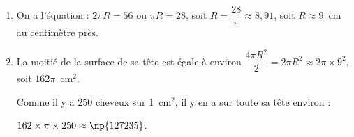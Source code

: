 
\medskip

%
%
%
%

\begin{enumerate}
\item %
On a l'équation : $2\pi R = 56$ ou $\pi R = 28$, soit $R = \dfrac{28}{\pi} \approx 8,91$, soit  $R \approx 9$~cm au centimètre près.
\item %

La moitié de la surface de sa tête est égale à environ $\dfrac{4\pi R^2}{2} = 2\pi R^2 \approx 2 \pi \times 9^2$, soit $162\pi$~cm$^2$.

Comme il y a $250$ cheveux sur 1~cm$^2$, il y en a sur toute sa tête environ :

$162 \times \pi \times 250 \approx \np{127235}$. 
\end{enumerate}

\vspace{0,5cm}


